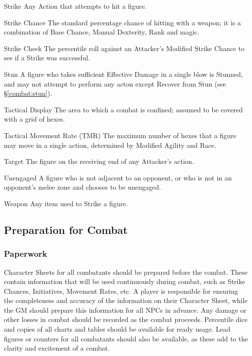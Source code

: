 \begin{multicols*}{3}
\begin{Description}
\item[Strike] Any Action that attempts to hit a figure.

\item[Strike Chance] The standard percentage chance of hitting with a
weapon; it is a combination of Base Chance, Manual Dexterity, Rank and
magic.

\item[Strike Check] The percentile roll against an Attacker's Modified
Strike Chance to see if a Strike was successful.

\item[Stun] A figure who takes sufficient Effective Damage in a single blow
is Stunned, and may not attempt to perform any acton except Recover
from Stun (see \S\ref{combat:stun}).

\item[Tactical Display] The area to which a combat is confined; assumed to
be covered with a grid of hexes.

\item[Tactical Movement Rate (TMR)] The maximum num\-ber of hexes that a
figure may move in a single action, determined by Modified Agility and
Race.

\item[Target] The figure on the receiving end of any Attacker's action.

\item[Unengaged] A figure who is not adjacent to an opponent, or who is not
in an opponent's melee zone and chooses to be unengaged.

\item[Weapon] Any item used to Strike a figure.

\end{Description}

\subsection{Preparation for Combat}

\subsubsection{Paperwork}

Character Sheets for all combatants should be prepared before the
combat. These contain information that will be used continuously
during combat, such as Strike Chances, Initiatives, Movement Rates,
etc. A player is responsible for ensuring the completeness and
accuracy of the information on their Character Sheet, while the GM
should prepare this information for all NPCs in advance. Any damage or
other losses in combat should be recorded as the combat
proceeds. Percentile dice and copies of all charts and tables should
be available for ready usage. Lead figures or counters for all
combatants should also be available, as these add to the clarity and
excitement of a combat.


\end{multicols*}
